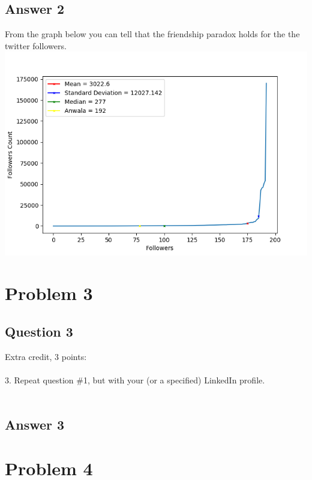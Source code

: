 \documentclass[10pt,letterpaper]{article}
\begin{document}
\subsection{Answer 2}
From the graph below you can tell that the friendship paradox holds for the the twitter followers.\\

\includegraphics[scale=1]{Question2.png} 

\pagebreak
\section{Problem 3}
\subsection{Question 3}
Extra credit, 3 points:\\
\\
3.  Repeat question \#1, but with your (or a specified) LinkedIn profile.\\
\\
\subsection{Answer 3}


\pagebreak
\section{Problem 4}
\end{document}
